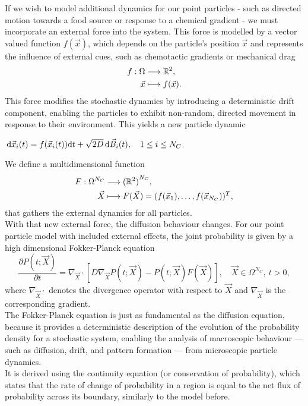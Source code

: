 If we wish to model additional dynamics for our point particles - such as directed motion towards a food source or response to a chemical gradient - we must incorporate an external force into the system. 
This force is modelled by a vector valued function $f(\vec{x})$, which depends on the particle's position $\vec{x}$ and represents the influence of external cues, such as chemotactic gradients or mechanical drag \\
\begin{align*}
	f : \Omega &\longrightarrow \mathbb{R}^2, \\
	\vec{x} &\longmapsto f(\vec{x}). 
\end{align*}
This force modifies the stochastic dynamics by introducing a deterministic drift component, enabling the particles to exhibit non-random, directed movement in response to their environment.
This yields a new particle dynamic 
\begin{center}
	$\, \mathrm{d} \vec{x}_i(t) = f(\vec{x}_i(t)) \mathrm{d} t + \sqrt{2D} \, \mathrm{d} \vec{B}_i(t), \quad 1 \leq i \leq N_C$. 
\end{center}
We define a multidimensional function
\begin{align*}
	F : \Omega^{N_C} &\longrightarrow {(\mathbb{R}^2)}^{N_C}, \\
	\vec{X} &\longmapsto F(\vec{X}) = (f(\vec{x}_1), \ldots, f(\vec{x}_{N_C}))^T,
\end{align*}
that gathers the external dynamics for all particles. \\
With that new external force, the diffusion behaviour changes. 
For our point particle model with included external effects, the joint probability is given by a high dimensional Fokker-Planck equation 
\[
	\dfrac{\partial P(t; \vec{X})}{\partial t} = \nabla_{\vec{X}} \cdot [D \nabla_{\vec{X}} P(t; \vec{X}) - P(t; \vec{X}) F(\vec{X})], \quad \vec{X} \in \Omega^{N_C}, \: t>0, 
\] 
where $\nabla_{\vec{X}} \cdot$ denotes the divergence operator with respect to $\vec{X}$ and $\nabla_{\vec{X}}$ is the corresponding gradient. \\
The Fokker-Planck equation is just as fundamental as the diffusion equation, because it provides a deterministic description of the evolution of the probability density for a stochastic system, enabling the analysis of macroscopic behaviour — such as diffusion, drift, and pattern formation — from microscopic particle dynamics. \\
It is derived using the continuity equation (or conservation of probability), which states that the rate of change of probability in a region is equal to the net flux of probability across its boundary, similarly to the model before. \\
